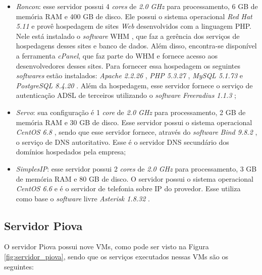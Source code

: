 \begin{itemize}
 \item \textit{Roncon}: esse servidor possui 4 \textit{cores} de \textit{2.0 GHz} para processamento, 6 GB de memória RAM e 400 GB de disco. 
 Ele possui o sistema operacional \textit{Red Hat 5.11} \cite{redhat} e provê hospedagem de sites \textit{Web} desenvolvidos com a linguagem 
 \ac{PHP}. Nele está instalado o \textit{software} \ac{WHM} \cite{whm}, que faz a gerência dos serviços de hospedagens desses sites e banco de 
 dados. Além disso, encontra-se disponível a ferramenta \textit{cPanel}, que faz parte do \ac{WHM} e fornece acesso aos desenvolvedores desses
 sites. Para fornecer essa hospedagem os seguintes \textit{softwares} estão instalados: \textit{Apache 2.2.26} \cite{apache}, 
 \textit{\ac{PHP} 5.3.27} \cite{php}, \textit{MySQL 5.1.73} \cite{mysql} e \textit{PostgreSQL 8.4.20} \cite{postgres}.
 Além da hospedagem, esse servidor fornece o serviço de autenticação \ac{ADSL} de terceiros utilizando o \textit{software} 
 \textit{Freeradius 1.1.3} \cite{freeradius};
 
 \item \textit{Servo}: sua configuração é 1 \textit{core} de \textit{2.0 GHz} para processamento, 2 GB de memória RAM e 30 GB de disco. 
 Esse servidor possui o sistema operacional \textit{CentOS 6.8} \cite{centos}, sendo que esse servidor fornece, através do \textit{software} 
 \textit{Bind 9.8.2} \cite{bind}, o serviço de \ac{DNS} autoritativo. Esse é o servidor \ac{DNS} secundário dos domínios hospedados pela empresa;
 
 \item \textit{SimplesIP}: esse servidor possui 2 \textit{cores} de \textit{2.0 GHz} para processamento, 3 GB de memória RAM e 80 GB de disco. 
 O servidor possui o sistema operacional \textit{CentOS 6.6} \cite{centos} e é o servidor de telefonia sobre \ac{IP} do provedor. Esse utiliza 
 como base o \textit{software} livre \textit{Asterisk 1.8.32} \cite{asterisk}.
\end{itemize}

\subsection{Servidor Piova}
\label{section:serv_piova}

O servidor Piova possui nove \ac{VM}s, como pode ser visto na Figura \ref{fig:servidor_piova}, sendo que os serviços executados nessas \ac{VM}s
são os seguintes:

